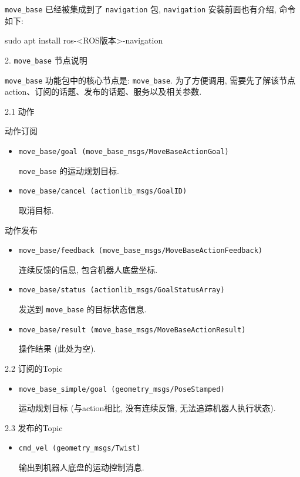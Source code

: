 \documentclass[openany, fontset=windowsold]{ctexbook}
\theoremstyle{kaiti}
\theoremstyle{normal}
\begin{document}
\verb|move_base| 已经被集成到了 \verb|navigation| 包, \verb|navigation| 安装前面也有介绍, 命令如下:

\begin{bash}
  sudo apt install ros-<ROS版本>-navigation
\end{bash}

2. \verb|move_base| 节点说明

\verb|move_base| 功能包中的核心节点是: \verb|move_base|. 为了方便调用, 需要先了解该节点action、订阅的话题、发布的话题、服务以及相关参数.

2.1 动作

动作订阅

\begin{itemize}
  \item \verb|move_base/goal (move_base_msgs/MoveBaseActionGoal)|

  \verb|move_base| 的运动规划目标.

  \item \verb|move_base/cancel (actionlib_msgs/GoalID)|

  取消目标.
\end{itemize}

动作发布

\begin{itemize}
  \item \verb|move_base/feedback (move_base_msgs/MoveBaseActionFeedback)|

  连续反馈的信息, 包含机器人底盘坐标.

  \item \verb|move_base/status (actionlib_msgs/GoalStatusArray)|

  发送到 \verb|move_base| 的目标状态信息.

  \item \verb|move_base/result (move_base_msgs/MoveBaseActionResult)|

  操作结果 (此处为空).
\end{itemize}

2.2 订阅的Topic

\begin{itemize}
  \item \verb|move_base_simple/goal (geometry_msgs/PoseStamped)|

  运动规划目标 (与action相比, 没有连续反馈, 无法追踪机器人执行状态).
\end{itemize}

2.3 发布的Topic

\begin{itemize}
  \item \verb|cmd_vel (geometry_msgs/Twist)|

  输出到机器人底盘的运动控制消息.
\end{itemize}
\end{document}
